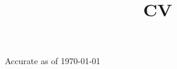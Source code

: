 \documentclass[11pt,letterpaper,roman]{moderncv}
\title{CV}
\begin{document}
\renewcommand*{\bibliographyhead}[1]{}

\makecvtitle


\hfill Accurate as of \today


%



%

%


%
%


%
\end{document}
